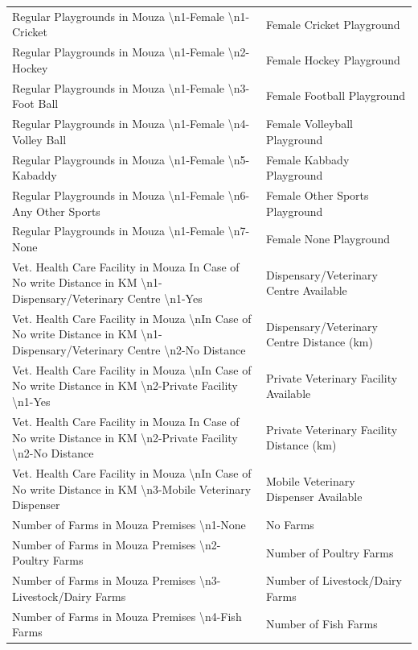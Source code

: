 \documentclass[10pt,a4paper]{article}
\begin{document}
\begin{longtable}{>{\raggedright\arraybackslash}p{7.5cm} >{\raggedright\arraybackslash}p{7.5cm}}
Regular Playgrounds in Mouza \textbackslash n1-Female \textbackslash n1-Cricket & Female Cricket Playground \\
Regular Playgrounds in Mouza \textbackslash n1-Female \textbackslash n2-Hockey & Female Hockey Playground \\
Regular Playgrounds in Mouza \textbackslash n1-Female \textbackslash n3-Foot Ball & Female Football Playground \\
Regular Playgrounds in Mouza \textbackslash n1-Female \textbackslash n4-Volley Ball & Female Volleyball Playground \\
Regular Playgrounds in Mouza \textbackslash n1-Female \textbackslash n5-Kabaddy & Female Kabbady Playground \\
Regular Playgrounds in Mouza \textbackslash n1-Female \textbackslash n6-Any Other Sports & Female Other Sports Playground \\
Regular Playgrounds in Mouza \textbackslash n1-Female \textbackslash n7-None & Female None Playground \\

Vet. Health Care Facility in Mouza In Case of No write Distance in KM \textbackslash n1-Dispensary/Veterinary Centre \textbackslash n1-Yes & Dispensary/Veterinary Centre Available \\
Vet. Health Care Facility in Mouza \textbackslash nIn Case of No write Distance in KM \textbackslash n1-Dispensary/Veterinary Centre \textbackslash n2-No Distance & Dispensary/Veterinary Centre Distance (km) \\
Vet. Health Care Facility in Mouza \textbackslash nIn Case of No write Distance in KM \textbackslash n2-Private Facility \textbackslash n1-Yes & Private Veterinary Facility Available \\
Vet. Health Care Facility in Mouza In Case of No write Distance in KM \textbackslash n2-Private Facility \textbackslash n2-No Distance & Private Veterinary Facility Distance (km) \\
Vet. Health Care Facility in Mouza \textbackslash nIn Case of No write Distance in KM \textbackslash n3-Mobile Veterinary Dispenser & Mobile Veterinary Dispenser Available \\

Number of Farms in Mouza Premises \textbackslash n1-None & No Farms \\
Number of Farms in Mouza Premises \textbackslash n2-Poultry Farms & Number of Poultry Farms \\
Number of Farms in Mouza Premises \textbackslash n3-Livestock/Dairy Farms & Number of Livestock/Dairy Farms \\
Number of Farms in Mouza Premises \textbackslash n4-Fish Farms & Number of Fish Farms \\


\end{longtable}
\end{document}
